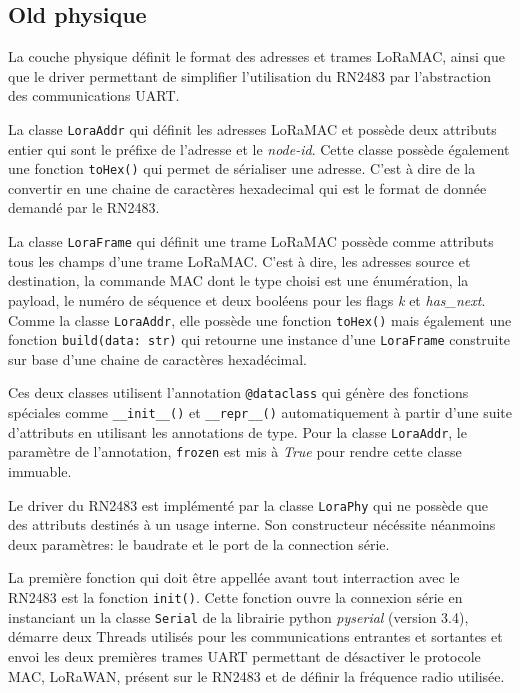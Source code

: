 \subsection*{Old physique}
    La couche physique définit le format des adresses et trames LoRaMAC, ainsi que que le driver 
    permettant de simplifier l'utilisation du RN2483 par l'abstraction des communications UART.

    La classe \texttt{LoraAddr} qui définit les adresses LoRaMAC et possède deux attributs entier 
    qui sont le préfixe de l'adresse et le \textit{node-id}. Cette classe possède également une 
    fonction \texttt{toHex()} qui permet de sérialiser une adresse. C'est à dire de la convertir en 
    une chaine de caractères hexadecimal qui est le format de donnée demandé par le RN2483.

    La classe \texttt{LoraFrame} qui définit une trame LoRaMAC possède comme attributs tous les 
    champs d'une trame LoRaMAC. C'est à dire, les adresses source et destination, la commande MAC 
    dont le type choisi est une énumération, la payload, le numéro de séquence et deux booléens 
    pour les flags \textit{k} et \textit{has\_next}. Comme la classe \texttt{LoraAddr}, elle 
    possède une fonction \texttt{toHex()} mais également une fonction \texttt{build(data: str)} qui 
    retourne une instance d'une \texttt{LoraFrame} construite sur base d'une chaine de caractères hexadécimal.

    Ces deux classes utilisent l'annotation \texttt{@dataclass} qui génère des fonctions spéciales 
    comme \texttt{\_\_init\_\_()} et \texttt{\_\_repr\_\_()} automatiquement à partir d'une suite 
    d'attributs en utilisant les annotations de type. Pour la classe \texttt{LoraAddr}, le 
    paramètre de l'annotation, \texttt{frozen} est mis à \textit{True} pour rendre cette classe 
    immuable.

    Le driver du RN2483 est implémenté par la classe \texttt{LoraPhy} qui ne possède que des 
    attributs destinés à un usage interne. Son constructeur nécéssite néanmoins deux paramètres: le 
    baudrate et le port de la connection série.

    La première fonction qui doit être appellée avant tout interraction avec le RN2483 est la 
    fonction \texttt{init()}. Cette fonction ouvre la connexion série en instanciant un la classe 
    \texttt{Serial} de la librairie python \textit{pyserial} (version 3.4), démarre deux Threads 
    utilisés pour les communications entrantes et sortantes et envoi les deux premières trames UART 
    permettant de désactiver le protocole MAC, LoRaWAN, présent sur le RN2483 et de définir la 
    fréquence radio utilisée.

